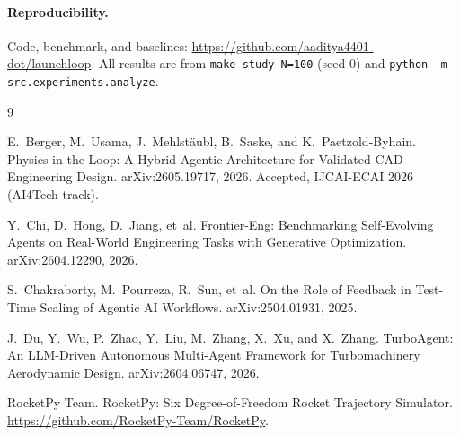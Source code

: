 \documentclass[11pt]{article}
\begin{document}
\paragraph{Reproducibility.} Code, benchmark, and baselines:
\url{https://github.com/aaditya4401-dot/launchloop}. All results are from
\texttt{make study N=100} (seed 0) and \texttt{python -m src.experiments.analyze}.

\begin{thebibliography}{9}

E.~Berger, M.~Usama, J.~Mehlst\"aubl, B.~Saske, and K.~Paetzold-Byhain.
\newblock Physics-in-the-Loop: A Hybrid Agentic Architecture for Validated CAD
Engineering Design.
\newblock arXiv:2605.19717, 2026. Accepted, IJCAI-ECAI 2026 (AI4Tech track).

Y.~Chi, D.~Hong, D.~Jiang, et~al.
\newblock Frontier-Eng: Benchmarking Self-Evolving Agents on Real-World
Engineering Tasks with Generative Optimization.
\newblock arXiv:2604.12290, 2026.

S.~Chakraborty, M.~Pourreza, R.~Sun, et~al.
\newblock On the Role of Feedback in Test-Time Scaling of Agentic AI Workflows.
\newblock arXiv:2504.01931, 2025.

J.~Du, Y.~Wu, P.~Zhao, Y.~Liu, M.~Zhang, X.~Xu, and X.~Zhang.
\newblock TurboAgent: An LLM-Driven Autonomous Multi-Agent Framework for
Turbomachinery Aerodynamic Design.
\newblock arXiv:2604.06747, 2026.

RocketPy Team.
\newblock RocketPy: Six Degree-of-Freedom Rocket Trajectory Simulator.
\newblock \url{https://github.com/RocketPy-Team/RocketPy}.

\end{thebibliography}
\end{document}
